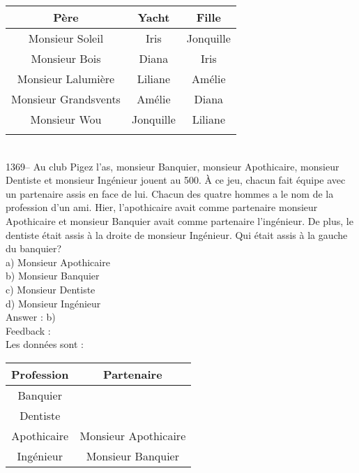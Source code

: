 \documentclass[letterpaper, 12pt]{article}
\begin{document}
\begin{tabular}{|c|c|c|} \hline
{\bf P\`ere} & {\bf Yacht} & {\bf Fille}  \\ \hline \hline

Monsieur Soleil        & Iris      &  Jonquille \\ \hline Monsieur
Bois          & Diana     &  Iris      \\ \hline Monsieur
Lalumi\`ere & Liliane   &  Am\'elie  \\ \hline Monsieur Grandsvents
& Am\'elie
&  Diana     \\ \hline Monsieur Wou & Jonquille &  Liliane   \\
\hline
\multicolumn{3}{c}{}\\
\end{tabular}\\


1369-- Au club \og Pigez l'as\fg , monsieur Banquier, monsieur
Apothicaire, monsieur Dentiste et monsieur Ing\'enieur jouent \og au
500\fg.  \`A ce jeu, chacun fait \'equipe avec un partenaire assis
en face de lui.  Chacun des quatre hommes a le nom de la profession
d'un ami.  Hier, l'apothicaire avait comme partenaire monsieur
Apothicaire et monsieur Banquier avait comme partenaire
l'ing\'enieur.  De plus, le dentiste \'etait assis \`a la droite
de monsieur Ing\'enieur.  Qui \'etait assis \`a la gauche du banquier?\\
a) Monsieur Apothicaire\\
b) Monsieur Banquier\\
c) Monsieur Dentiste\\
d) Monsieur Ing\'enieur\\

Answer : b)\\

Feedback : \\
Les donn\'ees sont : \\
\begin{tabular}{|c|c|} \hline
{\bf Profession} & {\bf Partenaire}    \\ \hline \hline

Banquier      &                       \\ \hline Dentiste      &
\\ \hline Apothicaire   & Monsieur Apothicaire  \\ \hline
Ing\'enieur   & Monsieur Banquier     \\ \hline
\end{tabular}\\
\end{document}
